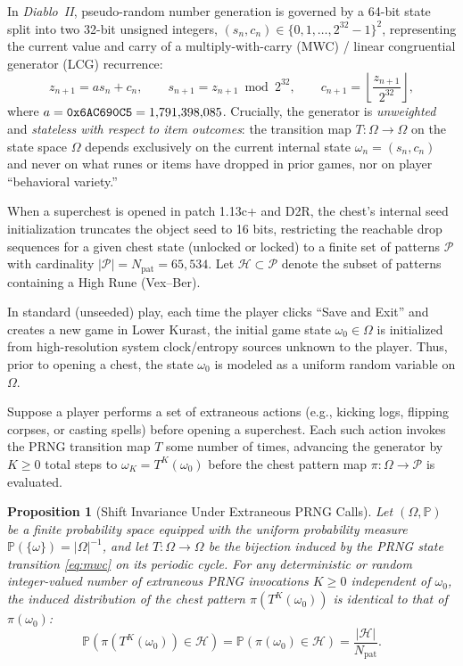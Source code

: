 \documentclass[11pt,reqno]{amsart}
\newtheorem{proposition}[theorem]{Proposition}
\theoremstyle{definition}
\begin{document}
In \emph{Diablo~II}, pseudo-random number generation is governed by a 64-bit state split into two 32-bit unsigned integers, $(s_n, c_n) \in \{0, 1, \dots, 2^{32}-1\}^2$, representing the current value and carry of a multiply-with-carry (MWC) / linear congruential generator (LCG) recurrence:
\begin{equation}
\label{eq:mwc}
    z_{n+1} = a s_n + c_n, \qquad s_{n+1} = z_{n+1} \bmod 2^{32}, \qquad c_{n+1} = \left\lfloor \frac{z_{n+1}}{2^{32}} \right\rfloor,
\end{equation}
where $a = \text{\texttt{0x6AC690C5}} = 1{,}791{,}398{,}085$. Crucially, the generator is \emph{unweighted} and \emph{stateless with respect to item outcomes}: the transition map $T\colon \Omega \to \Omega$ on the state space $\Omega$ depends exclusively on the current internal state $\omega_n = (s_n, c_n)$ and never on what runes or items have dropped in prior games, nor on player ``behavioral variety.''

When a superchest is opened in patch 1.13c+ and D2R, the chest's internal seed initialization truncates the object seed to 16 bits, restricting the reachable drop sequences for a given chest state (unlocked or locked) to a finite set of patterns $\mathcal{P}$ with cardinality $|\mathcal{P}| = N_{\text{pat}} = 65{,}534$. Let $\mathcal{H} \subset \mathcal{P}$ denote the subset of patterns containing a High Rune (Vex--Ber).

In standard (unseeded) play, each time the player clicks ``Save and Exit'' and creates a new game in Lower Kurast, the initial game state $\omega_0 \in \Omega$ is initialized from high-resolution system clock/entropy sources unknown to the player. Thus, prior to opening a chest, the state $\omega_0$ is modeled as a uniform random variable on $\Omega$.

Suppose a player performs a set of extraneous actions (e.g., kicking logs, flipping corpses, or casting spells) before opening a superchest. Each such action invokes the PRNG transition map $T$ some number of times, advancing the generator by $K \ge 0$ total steps to $\omega_K = T^K(\omega_0)$ before the chest pattern map $\pi\colon \Omega \to \mathcal{P}$ is evaluated.

\begin{proposition}[Shift Invariance Under Extraneous PRNG Calls]
\label{prop:shift}
Let $(\Omega, \mathbb{P})$ be a finite probability space equipped with the uniform probability measure $\mathbb{P}(\{\omega\}) = |\Omega|^{-1}$, and let $T\colon \Omega \to \Omega$ be the bijection induced by the PRNG state transition \eqref{eq:mwc} on its periodic cycle. For any deterministic or random integer-valued number of extraneous PRNG invocations $K \ge 0$ independent of $\omega_0$, the induced distribution of the chest pattern $\pi(T^K(\omega_0))$ is identical to that of $\pi(\omega_0)$:
\begin{equation}
    \mathbb{P}\!\left(\pi(T^K(\omega_0)) \in \mathcal{H}\right) = \mathbb{P}\!\left(\pi(\omega_0) \in \mathcal{H}\right) = \frac{|\mathcal{H}|}{N_{\text{pat}}}.
\end{equation}
\end{proposition}
\end{document}
